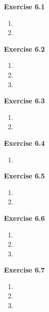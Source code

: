 




\textbf{Exercise 6.1}
\begin{enumerate}
    \item 
    \item 
\end{enumerate}

\textbf{Exercise 6.2}
\begin{enumerate}
    \item 
    \item 
    \item 
\end{enumerate}

\textbf{Exercise 6.3}
\begin{enumerate}
    \item 
    \item 
\end{enumerate}

\textbf{Exercise 6.4}
\begin{enumerate}
    \item 
\end{enumerate}

\textbf{Exercise 6.5}
\begin{enumerate}
    \item 
    \item 
\end{enumerate}

\textbf{Exercise 6.6}
\begin{enumerate}
    \item 
    \item 
    \item 
\end{enumerate}

\textbf{Exercise 6.7}
\begin{enumerate}
    \item 
    \item 
    \item 
\end{enumerate}


